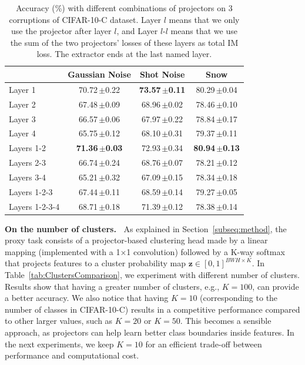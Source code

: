 \documentclass{article}
\newcommand{\mypar}[1]{\vspace{3pt}\noindent\textbf{#1~}}
\newcommand{\zz}{\mathbf{z}}
\newcommand{\ppm}{\,\scriptsize$\pm$}
\newcommand{\dorowcolors}{\rowcolors{2}{gray!15}{white}}
\begin{document}
\begin{table}[!t]
    \centering
    \begin{small}
    \dorowcolors
    \begin{tabular}{l|ccc}
    \toprule
        ~ & Gaussian Noise & Shot Noise & Snow \\ \midrule
        Layer 1 & 70.72\ppm0.22 & \textbf{73.57\ppm0.11} & 80.29\ppm0.04 \\ 
        Layer 2 & 67.48\ppm0.09 & 68.96\ppm0.02 & 78.46\ppm0.10  \\ 
        Layer 3 & 66.57\ppm0.06 & 67.97\ppm0.22 & 78.84\ppm0.17  \\ 
        Layer 4 & 65.75\ppm0.12 & 68.10\ppm0.31 & 79.37\ppm0.11   \\ 
        Layers 1-2 & \textbf{71.36\ppm0.03} & 72.93\ppm0.34 & \textbf{80.94\ppm0.13}   \\ 
        Layers 2-3 & 66.74\ppm0.24 & 68.76\ppm0.07 & 78.21\ppm0.12   \\ 
        Layers 3-4 & 65.21\ppm0.32 & 67.09\ppm0.15 &  78.34\ppm0.18   \\
        Layers 1-2-3 & 67.44\ppm0.11 & 68.59\ppm0.14 & 79.27\ppm0.05   \\
        Layers 1-2-3-4 & 68.71\ppm0.18 & 71.39\ppm0.12 & 78.38\ppm0.14   \\
    \bottomrule
    \end{tabular}
    \end{small}
    \caption{Accuracy (\%) with different combinations of projectors on 3 corruptions of CIFAR-10-C dataset. Layer $l$ means that we only use the projector after layer $l$, and Layer $l$-$l$ means that we use the sum of the two projectors' losses of these layers as total IM loss. The extractor ends at the last named layer.}
	\label{tab:LayersComparison}
\end{table}

\mypar{On the number of clusters.} As explained in Section~\ref{subseq:method}, the proxy task consists of a projector-based clustering head made by a linear mapping (implemented with a 1$\times$1 convolution) followed by a K-way softmax that projects features to a cluster probability map $\zz\! \in\![0,1]^{BWH\times K}$. In Table~\ref{tab:ClustersComparison}, we experiment with different number of clusters.
Results show that having a greater number of clusters, e.g., $K\!=\!100$, can provide a better accuracy. We also notice that having $K\!=\!10$ (corresponding to the number of classes in CIFAR-10-C) results in a competitive performance compared to other larger values, such as $K\!=\!20$ or $K\!=\!50$. This becomes a sensible approach, as projectors can help learn better class boundaries inside features.
In the next experiments, we keep $K\!=\!10$ for an efficient trade-off between performance and computational cost.
\end{document}
